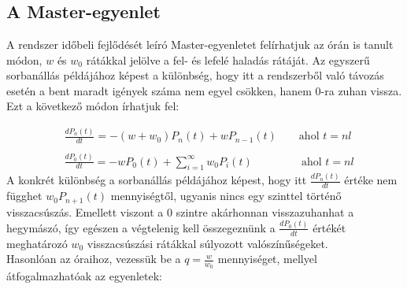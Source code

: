 \section{} \label{sec:4}

\subsection{A Master-egyenlet}
A rendszer időbeli fejlődését leíró Master-egyenletet felírhatjuk az órán is tanult módon, $w$ és $w_{0}$ rátákkal jelölve a fel- és lefelé haladás rátáját. Az egyszerű sorbanállás példájához képest a különbség, hogy itt a rendszerből való távozás esetén a bent maradt igények száma nem egyel csökken, hanem 0-ra zuhan vissza. Ezt a következő módon írhatjuk fel:

\begin{align}
    &\frac{d P_{n} \left( t \right)}{d t}
    =
    - \left( w + w_{0} \right) P_{n} \left( t \right)
    +
    w P_{n-1} \left( t \right)
    \quad \quad
    \text{ahol } t = nl
    \\ \nonumber \\
    &\frac{d P_{0} \left( t \right)}{d t}
    =
    - w P_{0} \left( t \right)
    +
    \sum_{i=1}^{\infty} w_{0} P_{i} \left( t \right)
    \quad \quad \quad \quad \ \
    \text{ahol } t = nl
\end{align}
A konkrét különbség a sorbanállás példájához képest, hogy itt $\frac{d P_{n} \left( t \right)}{d t}$ értéke nem függhet $w_{0} P_{n+1} \left( t \right)$ mennyiségtől, ugyanis nincs egy szinttel történő visszacsúszás. Emellett viszont a $0$ szintre akárhonnan visszazuhanhat a hegymászó, így egészen a végtelenig kell összegeznünk a $\frac{d P_{0} \left( t \right)}{d t}$ értékét meghatározó $w_{0}$ visszacsúszási rátákkal súlyozott valószínűségeket. \\
Hasonlóan az óraihoz, vezessük be a $q = \frac{w}{w_{0}}$ mennyiséget, mellyel átfogalmazhatóak az egyenletek:

